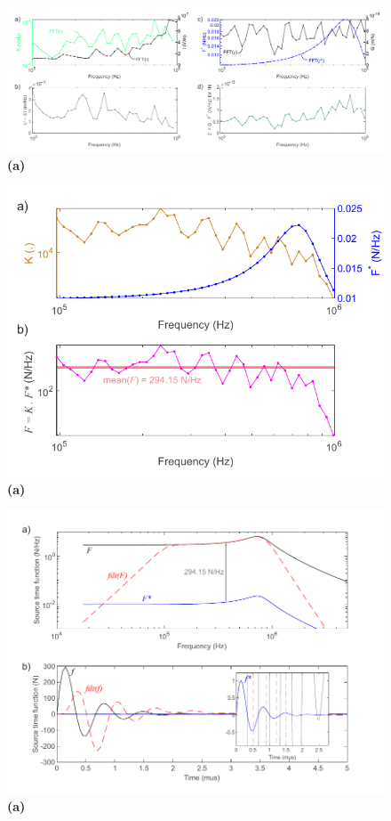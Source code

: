 \documentclass[preprint,3p, 11pt,authoryear]{elsarticle}
\begin{document}
\begin{figure}[ht]
     	\centering
\includegraphics[scale= 1]{FIG7.pdf} 
\caption{\textbf{(a)}  }
	\label{fig7} 
\end{figure}


\begin{figure}[ht]
     	\centering
\includegraphics[scale= 1]{FIG8.pdf} 
\caption{\textbf{(a)}  }
	\label{fig8} 
\end{figure}


\begin{figure}[ht]
     	\centering
\includegraphics[scale= 1]{FIG9.pdf} 
\caption{\textbf{(a)}  }
	\label{fig9} 
\end{figure}
\end{document}
